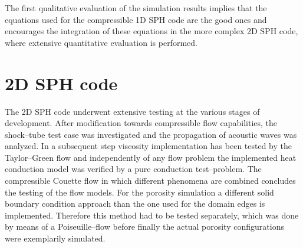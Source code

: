 \documentclass[11pt,a4paper,twoside]{report}
\begin{document}
The first qualitative evaluation of the simulation results implies that the equations used for the compressible 1D SPH code are the good ones and encourages the integration of these equations in the more complex 2D SPH code, where extensive quantitative evaluation is performed.  

 


\section{2D SPH code}
\label{sec:2DSPHcodeResults}

The 2D SPH code underwent extensive testing at the various stages of development. After modification towards compressible flow capabilities, the shock--tube test case was investigated and the propagation of acoustic waves was analyzed. In a subsequent step viscosity implementation has been tested by the Taylor--Green flow and independently of any flow problem the implemented heat conduction model was verified by a pure conduction test--problem. The compressible Couette flow in which different phenomena are combined concludes the testing of the flow models. For the porosity simulation a different solid boundary condition approach than the one used for the domain edges is implemented. Therefore this method had to be tested separately, which was done by means of a Poiseuille--flow before finally the actual porosity configurations were exemplarily simulated.
\end{document}

